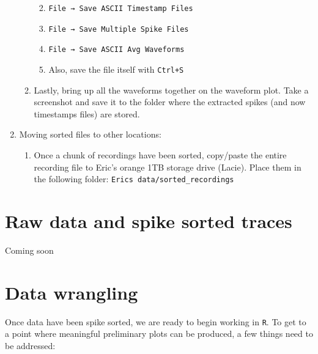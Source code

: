 \documentclass[
]{book}
\providecommand{\tightlist}{%
  \setlength{\itemsep}{0pt}\setlength{\parskip}{0pt}}
\begin{document}
\begin{enumerate}
\begin{enumerate}
    \begin{enumerate}
    \def\labelenumiii{\arabic{enumiii}.}
    \tightlist
    \item
      \texttt{File\ →\ Save\ ASCII\ Timestamp\ Files}
    \item
      \texttt{File\ →\ Save\ Multiple\ Spike\ Files}
    \item
      \texttt{File\ →\ Save\ ASCII\ Avg\ Waveforms}
    \item
      Also, save the file itself with \texttt{Ctrl+S}
    \end{enumerate}
  \item
    Lastly, bring up all the waveforms together on the waveform
    plot. Take a screenshot and save it to the folder where the
    extracted spikes (and now timestamps files) are stored.
  \end{enumerate}
\item
  Moving sorted files to other locations:

  \begin{enumerate}
  \def\labelenumii{\arabic{enumii}.}
  \tightlist
  \item
    Once a chunk of recordings have been sorted, copy/paste the
    entire recording file to Eric's orange 1TB storage drive
    (Lacie). Place them in the following folder:
    \texttt{Eric\textquotesingle{}s\ data/sorted\_recordings}
  \end{enumerate}
\end{enumerate}

\hypertarget{raw-data-and-spike-sorted-traces}{%
\chapter{Raw data and spike sorted traces}\label{raw-data-and-spike-sorted-traces}}

Coming soon

\hypertarget{data-wrangling}{%
\chapter{Data wrangling}\label{data-wrangling}}

Once data have been spike sorted, we are ready to begin working in
\texttt{R}. To get to a point where meaningful preliminary plots can be
produced, a few things need to be addressed:
\end{document}
